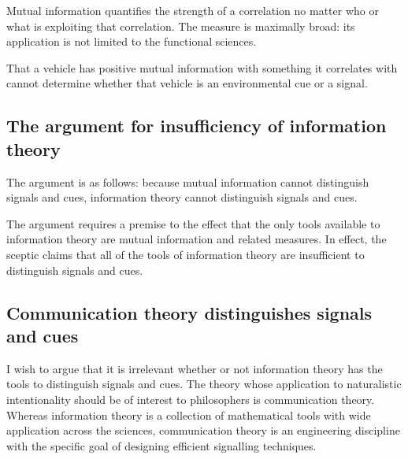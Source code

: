 Mutual information quantifies the strength of a correlation no matter who or what is exploiting that correlation.
The measure is maximally broad: its application is not limited to the functional sciences.

That a vehicle has positive mutual information with something it correlates with cannot determine whether that vehicle is an environmental cue or a signal.

\subsection{The argument for insufficiency of information theory}

The argument is as follows: because mutual information cannot distinguish signals and cues, information theory cannot distinguish signals and cues.

The argument requires a premise to the effect that the only tools available to information theory are mutual information and related measures.
In effect, the sceptic claims that all of the tools of information theory are insufficient to distinguish signals and cues.


\subsection{Communication theory distinguishes signals and cues}

I wish to argue that it is irrelevant whether or not information theory has the tools to distinguish signals and cues.
The theory whose application to naturalistic intentionality should be of interest to philosophers is communication theory.
Whereas information theory is a collection of mathematical tools with wide application across the sciences, communication theory is an engineering discipline with the specific goal of designing efficient signalling techniques.